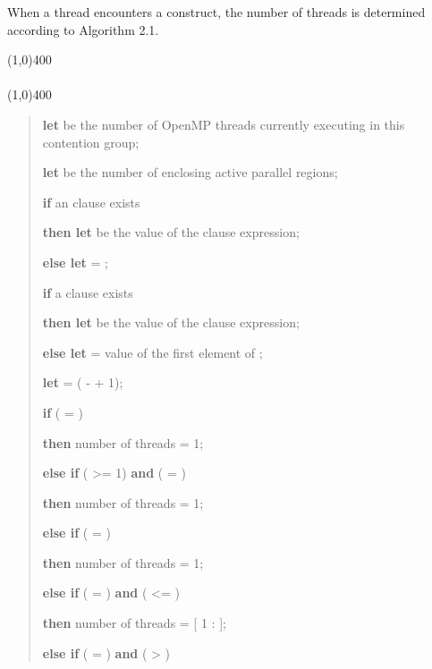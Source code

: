 When a thread encounters a  construct, the number of threads is determined 
according to Algorithm 2.1.

\begin{samepage}
\nolinenumbers\line(1,0){400}\\[.4\baselineskip]
\\[-0.5\baselineskip]
\line(1,0){400}\linenumbers

\begin{quote}
\textbf{let}  be the number of OpenMP threads currently executing in 
this contention group;

\textbf{let}  be the number of enclosing active parallel regions;

\textbf{if} an  clause exists

\textbf{then let}  be the value of the  clause expression; 

\textbf{else let}  = ; 

\textbf{if} a  clause exists 

\textbf{then let}  be the value of the  clause 
expression; 

\textbf{else let}  = value of the first element of ; 

\textbf{let}  = ( -  + 1);

\textbf{if} ( = ) 

\textbf{then} number of threads = 1; 

\textbf{else if} ( >= 1) \textbf{and} ( = ) 

\textbf{then} number of threads = 1; 

\textbf{else if} ( = ) 

\textbf{then} number of threads = 1; 

\textbf{else if} ( = ) \textbf{and} ( <= )

\textbf{then} number of threads = [ 1 :  ];

\textbf{else if} ( = ) \textbf{and} ( > )


\end{quote}
\end{samepage}
